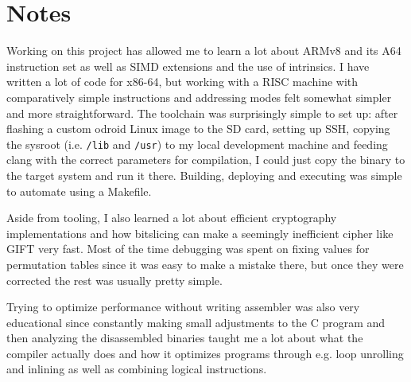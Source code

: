 \pagebreak

\section{Notes}

Working on this project has allowed me to learn a lot about ARMv8 and its A64
instruction set as well as SIMD extensions and the use of intrinsics. I have
written a lot of code for x86-64, but working with a RISC machine with
comparatively simple instructions and addressing modes felt somewhat simpler
and more straightforward. The toolchain was surprisingly simple to set up:
after flashing a custom odroid Linux image to the SD card, setting up SSH,
copying the sysroot (i.e. \texttt{/lib} and \texttt{/usr}) to my local
development machine and feeding clang with the correct parameters for
compilation, I could just copy the binary to the target system and run it
there. Building, deploying and executing was simple to automate using a
Makefile.

Aside from tooling, I also learned a lot about efficient cryptography
implementations and how bitslicing can make a seemingly inefficient cipher like
GIFT very fast. Most of the time debugging was spent on fixing values for
permutation tables since it was easy to make a mistake there, but once they
were corrected the rest was usually pretty simple.

Trying to optimize performance without writing assembler was also very
educational since constantly making small adjustments to the C program and then
analyzing the disassembled binaries taught me a lot about what the compiler
actually does and how it optimizes programs through e.g. loop unrolling and
inlining as well as combining logical instructions.
